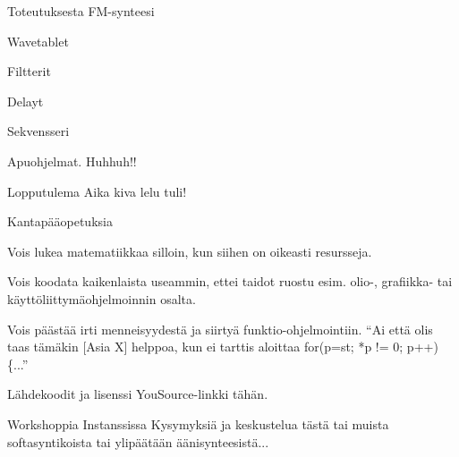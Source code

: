 \documentclass{beamer}
\begin{document}
\begin{frame}{Toteutuksesta}
  FM-synteesi

  Wavetablet

  Filtterit

  Delayt

  Sekvensseri

  Apuohjelmat. Huhhuh!!
  
\end{frame}


\begin{frame}{Lopputulema}
  Aika kiva lelu tuli!
\end{frame}

\begin{frame}{Kantapääopetuksia}

  Vois lukea matematiikkaa silloin, kun siihen on oikeasti resursseja.

  Vois koodata kaikenlaista useammin, ettei taidot ruostu esim. olio-,
  grafiikka- tai käyttöliittymäohjelmoinnin osalta.

  Vois päästää irti menneisyydestä ja siirtyä
  funktio-ohjelmointiin. ``Ai että olis taas tämäkin [Asia X] helppoa,
  kun ei tarttis aloittaa for(p=st; *p != 0; p++)\{...''
  
\end{frame}

\begin{frame}{Lähdekoodit ja lisenssi}
  YouSource-linkki tähän.
\end{frame}

\begin{frame}{Workshoppia Instanssissa}
  Kysymyksiä ja keskustelua tästä tai muista softasyntikoista tai
  ylipäätään äänisynteesistä...
\end{frame}
\end{document}
